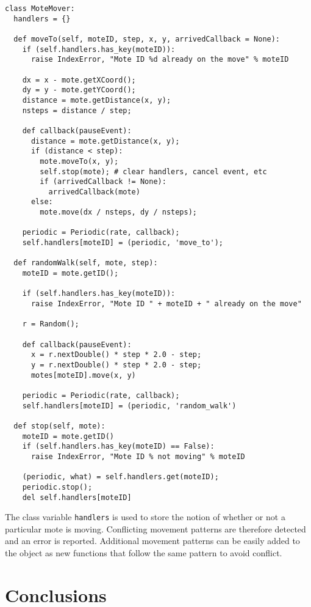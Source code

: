 \documentclass[10pt]{article}
\begin{document}
\begin{verbatim}
class MoteMover:
  handlers = {}

  def moveTo(self, moteID, step, x, y, arrivedCallback = None):
    if (self.handlers.has_key(moteID)):
      raise IndexError, "Mote ID %d already on the move" % moteID 

    dx = x - mote.getXCoord();
    dy = y - mote.getYCoord();
    distance = mote.getDistance(x, y);
    nsteps = distance / step;

    def callback(pauseEvent):
      distance = mote.getDistance(x, y);
      if (distance < step):
        mote.moveTo(x, y);
        self.stop(mote); # clear handlers, cancel event, etc
        if (arrivedCallback != None):
          arrivedCallback(mote)
      else:
        mote.move(dx / nsteps, dy / nsteps);

    periodic = Periodic(rate, callback);
    self.handlers[moteID] = (periodic, 'move_to');

  def randomWalk(self, mote, step):
    moteID = mote.getID();

    if (self.handlers.has_key(moteID)):
      raise IndexError, "Mote ID " + moteID + " already on the move"

    r = Random();
    
    def callback(pauseEvent):
      x = r.nextDouble() * step * 2.0 - step;
      y = r.nextDouble() * step * 2.0 - step;
      motes[moteID].move(x, y)
      
    periodic = Periodic(rate, callback);
    self.handlers[moteID] = (periodic, 'random_walk')

  def stop(self, mote):
    moteID = mote.getID()
    if (self.handlers.has_key(moteID) == False):
      raise IndexError, "Mote ID % not moving" % moteID

    (periodic, what) = self.handlers.get(moteID);
    periodic.stop();
    del self.handlers[moteID]

\end{verbatim}

The class variable {\tt handlers} is used to store the notion of
whether or not a particular mote is moving. Conflicting movement
patterns are therefore detected and an error is reported. Additional
movement patterns can be easily added to the  object as new functions
that follow the same pattern to avoid conflict.

\section{Conclusions}
\end{document}
